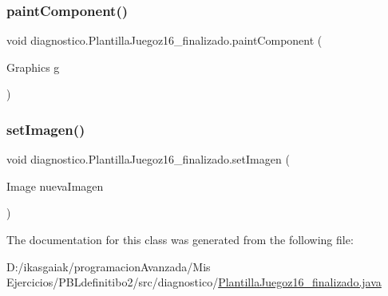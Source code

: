 \subsubsection{\texorpdfstring{paint\+Component()}{paintComponent()}}
{\footnotesize\ttfamily void diagnostico.\+Plantilla\+Juegoz16\+\_\+finalizado.\+paint\+Component (\begin{DoxyParamCaption}\item[{Graphics}]{g }\end{DoxyParamCaption})\hspace{0.3cm}{\ttfamily [protected]}}

\mbox{\label{classdiagnostico_1_1_plantilla_juegoz16__finalizado_a3901c5e6e60b75ee7a56c5f7253795f6}} 
\subsubsection{\texorpdfstring{set\+Imagen()}{setImagen()}}
{\footnotesize\ttfamily void diagnostico.\+Plantilla\+Juegoz16\+\_\+finalizado.\+set\+Imagen (\begin{DoxyParamCaption}\item[{Image}]{nueva\+Imagen }\end{DoxyParamCaption})}



The documentation for this class was generated from the following file\+:\begin{DoxyCompactItemize}
\item 
D\+:/ikasgaiak/programacion\+Avanzada/\+Mis Ejercicios/\+P\+B\+Ldefinitibo2/src/diagnostico/\mbox{\hyperlink{_plantilla_juegoz16__finalizado_8java}{Plantilla\+Juegoz16\+\_\+finalizado.\+java}}\end{DoxyCompactItemize}
